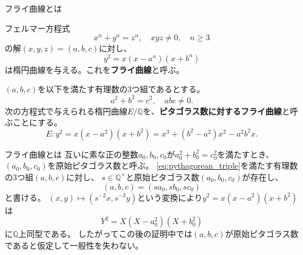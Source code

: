 \documentclass{classes/mybeamer}
\begin{document}
\begin{frame}{フライ曲線とは}
    \begin{dfn*}
        フェルマー方程式
        \begin{equation}
            x^n + y^n = z^n, \quad xyz \neq 0, \quad n \geq 3
        \end{equation}
        の解$(x, y, z)=(a,b,c)$に対し、
        \begin{equation}
            y^2 = x (x-a^n) (x+b^n)
        \end{equation}
        は楕円曲線を与える。これを\color{blue}\textbf{フライ曲線}\color{black}と呼ぶ。
    \end{dfn*}
    \begin{dfn*}
        $(a,b,c)$を以下を満たす有理数の$3$つ組であるとする。
        \begin{equation}
            \label{eq:pythagorean_triple}
            a^2+b^2=c^2, \quad abc \neq 0.
        \end{equation}
        次の方程式で与えられる楕円曲線$E/\mathbb{Q}$を、\color{blue}\textbf{ピタゴラス数に対するフライ曲線}\color{black}と呼ぶことにする。
        \begin{equation}
            \label{eq:pythagorean_frey_curve}
            E: y^2 = x (x-a^2) (x+b^2) = x^3 + (b^2 - a^2) x^2 - a^2b^2x.
        \end{equation}
    \end{dfn*}
\end{frame}

\begin{frame}{フライ曲線とは}
    互いに素な正の整数$a_0,b_0,c_0$が$a_0^2+b_0^2=c_0^2$を満たすとき、$(a_0,b_0,c_0)$を原始ピタゴラス数と呼ぶ。
    \eqref{eq:pythagorean_triple}を満たす有理数の$3$つ組$(a, b, c)$に対し、
    $s\in \mathbb{Q}^\times$と原始ピタゴラス数$(a_0, b_0, c_0)$が存在し、
    \begin{equation}
        (a,b,c) = (sa_0, sb_0, sc_0)
    \end{equation}
    と書ける。 $(x,y)\mapsto (s^{-2}x, s^{-3}y)$という変換により$y^2=x(x-a^2)(x+b^2)$は
    \begin{equation}
        Y^2 = X (X-a_0^2) (X+b_0^2)
    \end{equation}
    に$\mathbb{Q}$上同型である。
    したがってこの後の証明中では\color{red}$(a,b,c)$が原始ピタゴラス数であると仮定して一般性を失わない。\color{black}
\end{frame}
\end{document}

